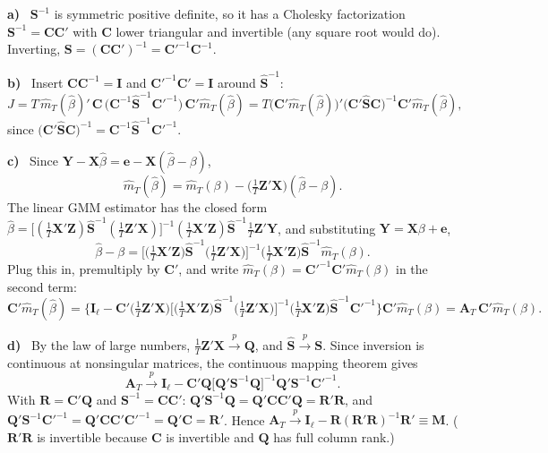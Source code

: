 \documentclass[11pt]{article}
\newcommand{\symbf}[1]{\boldsymbol{#1}}
\newcommand{\itm}[1]{\par\textbf{#1)}\ }
\begin{document}
\itm{a}
$\symbf S^{-1}$ is symmetric positive definite, so it has a Cholesky factorization $\symbf S^{-1}=\symbf C\symbf C'$ with $\symbf C$ lower triangular and invertible (any square root would do). Inverting, $\symbf S=(\symbf C\symbf C')^{-1}=\symbf C'^{-1}\symbf C^{-1}$.

\itm{b}
Insert $\symbf C\symbf C^{-1}=\symbf I$ and $\symbf C'^{-1}\symbf C'=\symbf I$ around $\hat{\symbf S}^{-1}$:
\[
J=T\,\hat m_T(\hat\beta)'\,\symbf C\,\big(\symbf C^{-1}\hat{\symbf S}^{-1}\symbf C'^{-1}\big)\,\symbf C'\hat m_T(\hat\beta)=T\big(\symbf C'\hat m_T(\hat\beta)\big)'\big(\symbf C'\hat{\symbf S}\symbf C\big)^{-1}\symbf C'\hat m_T(\hat\beta),
\]
since $\big(\symbf C'\hat{\symbf S}\symbf C\big)^{-1}=\symbf C^{-1}\hat{\symbf S}^{-1}\symbf C'^{-1}$.

\itm{c}
Since $\symbf Y-\symbf X\hat\beta=\symbf e-\symbf X(\hat\beta-\beta)$,
\[
\hat m_T(\hat\beta)=\hat m_T(\beta)-\Big(\tfrac1T\symbf Z'\symbf X\Big)(\hat\beta-\beta).
\]
The linear GMM estimator has the closed form $\hat\beta=\big[(\frac1T\symbf X'\symbf Z)\hat{\symbf S}^{-1}(\frac1T\symbf Z'\symbf X)\big]^{-1}(\frac1T\symbf X'\symbf Z)\hat{\symbf S}^{-1}\frac1T\symbf Z'\symbf Y$, and substituting $\symbf Y=\symbf X\beta+\symbf e$,
\[
\hat\beta-\beta=\Big[\Big(\tfrac1T\symbf X'\symbf Z\Big)\hat{\symbf S}^{-1}\Big(\tfrac1T\symbf Z'\symbf X\Big)\Big]^{-1}\Big(\tfrac1T\symbf X'\symbf Z\Big)\hat{\symbf S}^{-1}\hat m_T(\beta).
\]
Plug this in, premultiply by $\symbf C'$, and write $\hat m_T(\beta)=\symbf C'^{-1}\symbf C'\hat m_T(\beta)$ in the second term:
\[
\symbf C'\hat m_T(\hat\beta)=\Big\{\symbf I_\ell-\symbf C'\Big(\tfrac1T\symbf Z'\symbf X\Big)\Big[\Big(\tfrac1T\symbf X'\symbf Z\Big)\hat{\symbf S}^{-1}\Big(\tfrac1T\symbf Z'\symbf X\Big)\Big]^{-1}\Big(\tfrac1T\symbf X'\symbf Z\Big)\hat{\symbf S}^{-1}\symbf C'^{-1}\Big\}\symbf C'\hat m_T(\beta)=\symbf A_T\,\symbf C'\hat m_T(\beta).
\]

\itm{d}
By the law of large numbers, $\frac1T\symbf Z'\symbf X\xrightarrow{p}\symbf Q$, and $\hat{\symbf S}\xrightarrow{p}\symbf S$. Since inversion is continuous at nonsingular matrices, the continuous mapping theorem gives
\[
\symbf A_T\xrightarrow{p}\symbf I_\ell-\symbf C'\symbf Q\big[\symbf Q'\symbf S^{-1}\symbf Q\big]^{-1}\symbf Q'\symbf S^{-1}\symbf C'^{-1}.
\]
With $\symbf R=\symbf C'\symbf Q$ and $\symbf S^{-1}=\symbf C\symbf C'$: $\symbf Q'\symbf S^{-1}\symbf Q=\symbf Q'\symbf C\symbf C'\symbf Q=\symbf R'\symbf R$, and $\symbf Q'\symbf S^{-1}\symbf C'^{-1}=\symbf Q'\symbf C\symbf C'\symbf C'^{-1}=\symbf Q'\symbf C=\symbf R'$. Hence $\symbf A_T\xrightarrow{p}\symbf I_\ell-\symbf R(\symbf R'\symbf R)^{-1}\symbf R'\equiv\symbf M$. ($\symbf R'\symbf R$ is invertible because $\symbf C$ is invertible and $\symbf Q$ has full column rank.)
\end{document}

